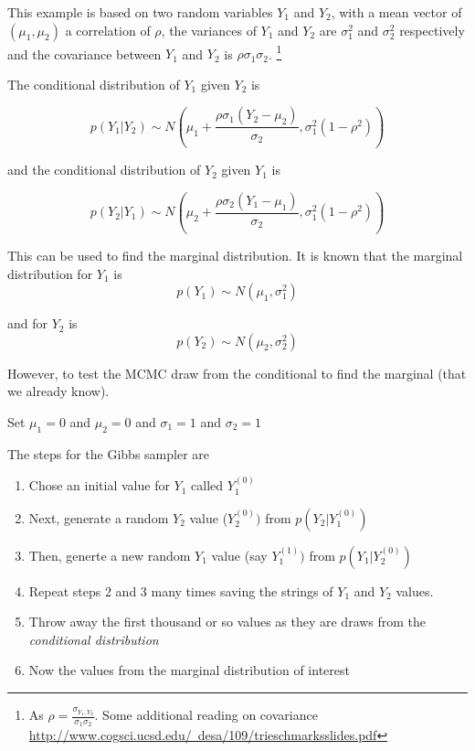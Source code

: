 \documentclass[12pt, a4paper, oneside]{article}\usepackage[]{graphicx}\usepackage[]{color}
\begin{document}
This example is based on two random variables $Y_1$ and $Y_2$, with a mean vector of $(\mu_1, \mu_2)$ a correlation of $\rho$, the variances of $Y_1$ and $Y_2$ are $\sigma_1^2$ and $\sigma_2^2$ respectively and the covariance between $Y_1$ and $Y_2$ is $\rho \sigma_1 \sigma_2$. \footnote{As $\rho = \frac{\sigma_{Y_1, Y_2}}{\sigma_1 \sigma_2}$.  Some additional reading on covariance \href{http://www.cogsci.ucsd.edu/~desa/109/trieschmarksslides.pdf}{http://www.cogsci.ucsd.edu/~desa/109/trieschmarksslides.pdf}}



The conditional distribution of $Y_1$ given $Y_2$ is 

\begin{equation}
p(Y_1| Y_2) \sim N \left(\mu_1 + \frac{\rho\sigma_1(Y_2 - \mu_2)}{\sigma_2}, \sigma_1^2(1 - \rho^2)\right)
\end{equation}

and the conditional distribution of $Y_2$ given $Y_1$ is

\begin{equation}
p(Y_2| Y_1) \sim N \left(\mu_2 + \frac{\rho\sigma_2(Y_1 - \mu_1)}{\sigma_2}, \sigma_1^2(1 - \rho^2) \right)
\end{equation}

This can be used to find the marginal distribution. It is known that the marginal distribution for $Y_1$ is
\begin{equation}
p(Y_1) \sim N(\mu_1, \sigma_1^2)
\end{equation}

and for $Y_2$ is 
\begin{equation}
p(Y_2) \sim N(\mu_2, \sigma_2^2)
\end{equation}

However, to test the MCMC draw from the conditional to find the marginal (that we already know).  

Set $\mu_1 = 0$ and $\mu_2 = 0$ and $\sigma_1 = 1$ and $\sigma_2 = 1$

The steps for the Gibbs sampler are 
\begin{enumerate}
\item Chose an initial value for $Y_1$ called $Y_1^{(0)}$
\item Next, generate a random $Y_2$ value ($Y_2^{(0)})$ from $p(Y_2| Y_1^{(0)})$
\item Then, generte a new random $Y_1$ value (say $Y_1^{(1)})$ from $p(Y_1| Y_2^{(0)})$
\item Repeat steps 2 and 3 many times saving the strings of $Y_1$ and $Y_2$ values.
\item Throw away the first thousand or so values as they are draws from the \emph{conditional distribution}
\item Now the values from the marginal distribution of interest
\end{enumerate}
\end{document}
